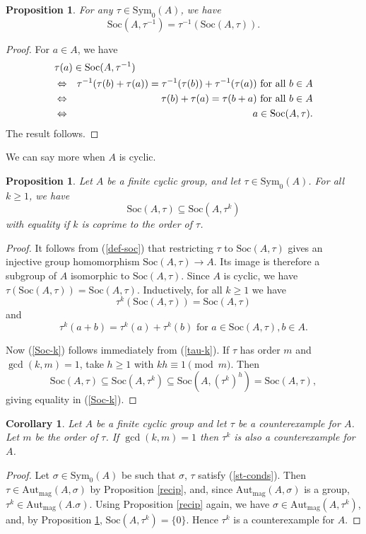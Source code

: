\documentclass[letterpaper,12pt]{amsart}
\numberwithin{equation}{section}
\numberwithin{algorithm}{section}
\newtheorem{proposition}[lemma]{Proposition}
\newtheorem{corollary}[lemma]{Corollary}
\theoremstyle{definition}
\newcommand{\LRA}{\Leftrightarrow}
\newcommand{\Soc}{\mathrm{Soc}}
\newcommand{\Autmag}{\mathrm{Aut}_\mathrm{mag}}
\newcommand{\Symo}{\mathrm{Sym}_0}
\begin{document}
\begin{proposition} \label{inv-tau}
	For any $\tau \in \Symo(A)$, we have
	$$\Soc(A,\tau^{-1}) = \tau^{-1}(\Soc(A,\tau)). $$
\end{proposition}
\begin{proof}
	For $a \in A$, we have
	\begin{eqnarray*}
		\lefteqn{\tau(a) \in \Soc(A,\tau^{-1}) } \\ & \LRA & \tau^{-1}(\tau(b)+\tau(a)) = \tau^{-1}(\tau(b)) + \tau^{-1}(\tau(a)) \mbox{ for all }b \in A \\
		& \LRA & \tau(b) + \tau(a) = \tau(b+a) \mbox{ for all }b \in A \\
		& \LRA & a \in\Soc(A,\tau).
	\end{eqnarray*}	
	The result follows.
\end{proof}

We can say more when $A$ is cyclic.

\begin{proposition} \label{Soc-k-prop}
	Let $A$ be a finite cyclic group, and let $\tau \in \Symo(A)$. For all $k \geq 1$, we have
	\begin{equation} \label{Soc-k} 
		\Soc(A,\tau) \subseteq \Soc(A,\tau^k) 
	\end{equation}
	with equality if $k$ is coprime to the order of $\tau$.
\end{proposition}
\begin{proof}
	It follows from (\ref{def-soc}) that restricting $\tau$ to $\Soc(A,\tau)$ gives an injective group homomorphism $\Soc(A,\tau) \to A$. Its image is therefore a subgroup of $A$ isomorphic to $\Soc(A,\tau)$. Since $A$ is cyclic, we have $\tau(\Soc(A,\tau))=\Soc(A,\tau)$. Inductively, for all $k \geq 1$ we have
	$$ \tau^k(\Soc(A,\tau)) = \Soc(A,\tau) $$
	and
	\begin{equation}  \label{tau-k}
		\tau^k(a+b)=\tau^k(a) + \tau^k(b) \mbox{ for } a \in \Soc(A,\tau), b \in A. 
	\end{equation}
	
Now (\ref{Soc-k}) follows immediately from (\ref{tau-k}). If $\tau$ has order $m$ and $\gcd(k,m)=1$, take $h \geq 1$ with $kh \equiv 1 \pmod{m}$. Then
$$ 	\Soc(A,\tau) \subseteq \Soc(A,\tau^k) \subseteq \Soc(A,(\tau^k)^h)=\Soc(A,\tau), $$  
giving equality in (\ref{Soc-k}).
\end{proof}

\begin{corollary} \label{cyclic-powers}
Let $A$ be a finite cyclic group and let $\tau$ be a counterexample for $A$. Let $m$ be the order of $\tau$. If $\gcd(k,m)=1$ then $\tau^k$ is also a counterexample for $A$.
\end{corollary}
\begin{proof}
Let $\sigma \in \Symo(A)$ be such that $\sigma$, $\tau$ satisfy (\ref{st-conds}). Then $\tau \in \Autmag(A,\sigma)$ by Proposition \ref{recip}, and, since $\Autmag(A,\sigma)$ is a group, $\tau^k \in \Autmag(A.\sigma)$. Using Proposition \ref{recip} again, we have $\sigma \in \Autmag(A,\tau^k)$, and, by Proposition \ref{Soc-k-prop}, $\Soc(A,\tau^k)=\{0\}$. Hence $\tau^k$ is a counterexample for $A$. 
\end{proof}
\end{document}
